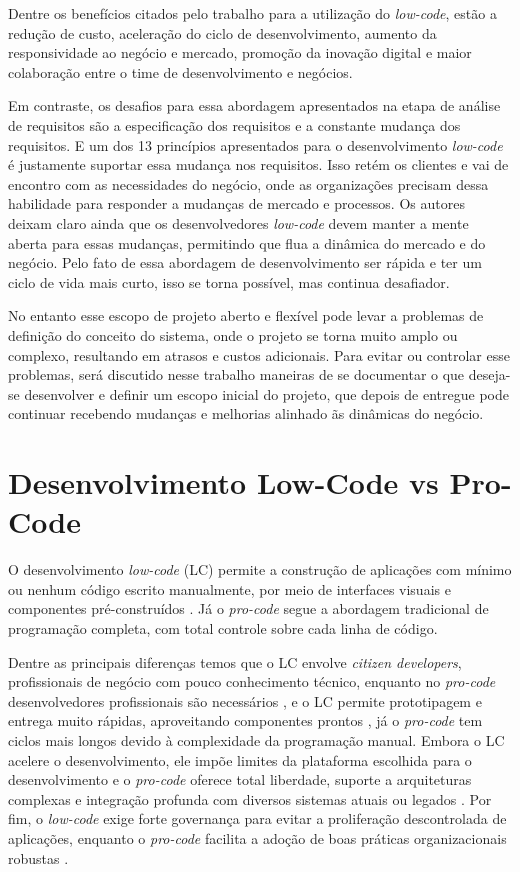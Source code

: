	Dentre os benefícios citados pelo trabalho para a utilização do \textit{low-code}, estão a redução de custo, aceleração do ciclo de desenvolvimento, aumento da responsividade
	ao negócio e mercado, promoção da inovação digital e maior colaboração entre o time de desenvolvimento e negócios.

	Em contraste, os desafios para essa abordagem apresentados na etapa de análise de requisitos são a especificação dos requisitos e a constante mudança dos requisitos. E um dos 13 princípios
	apresentados para o desenvolvimento \textit{low-code} é justamente suportar essa mudança nos requisitos. Isso retém os clientes e vai de encontro com as necessidades do negócio,
	onde as organizações precisam dessa habilidade para responder a mudanças de mercado e processos. Os autores deixam claro ainda que os desenvolvedores \textit{low-code} devem manter a mente aberta
	para essas mudanças, permitindo que flua a dinâmica do mercado e do negócio. Pelo fato de essa abordagem de desenvolvimento ser rápida e ter um ciclo de vida mais curto, isso se torna possível,
	mas continua desafiador.

	No entanto esse escopo de projeto aberto e flexível pode levar a problemas de definição do conceito do sistema, onde o projeto
	se torna muito amplo ou complexo, resultando em atrasos e custos adicionais. Para evitar ou controlar esse problemas, será discutido nesse trabalho maneiras de se documentar o que deseja-se
	desenvolver e definir um escopo inicial do projeto, que depois de entregue pode continuar recebendo mudanças e melhorias alinhado ãs dinâmicas do negócio.


	\section{Desenvolvimento Low-Code vs Pro-Code}\label{sec:lowcode}

	O desenvolvimento \textit{low-code} (LC) permite a construção de aplicações com mínimo ou nenhum código escrito manualmente, por meio de interfaces
	visuais e componentes pré-construídos \cite{richardson2014new}. Já o \textit{pro-code} segue a abordagem tradicional de programação completa, com total
	controle sobre cada linha de código.

	Dentre as principais diferenças temos que o LC envolve \textit{citizen developers}, profissionais de negócio com pouco conhecimento técnico, enquanto no \textit{pro-code} desenvolvedores profissionais são necessários \cite{LowCodeLifeCicle}, e
	o LC permite prototipagem e entrega muito rápidas, aproveitando componentes prontos \cite{techtargetLowCode}, já o \textit{pro-code} tem ciclos mais longos devido à complexidade da programação manual.
	Embora o LC acelere o desenvolvimento, ele impõe limites da plataforma escolhida para o desenvolvimento e o \textit{pro-code} oferece total liberdade, suporte a arquiteturas complexas e integração profunda com diversos sistemas atuais ou legados \cite{techtargetLowCode}.
	Por fim, o \textit{low-code} exige forte governança para evitar a proliferação descontrolada de aplicações, enquanto o \textit{pro-code} facilita a adoção de boas práticas organizacionais robustas \cite{forbesLowCode}.

